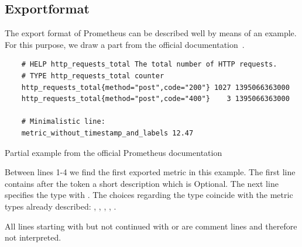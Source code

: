 \subsection{Exportformat}
The export format of Prometheus can be described well by means of an example. For this purpose, we draw a part from the official documentation~\cite{PrometheusExpositionFormatBeispiel}.\\
\par
\label{subsec:Exportformat}
\begin{listing}[H]
	\begin{verbatim}
	# HELP http_requests_total The total number of HTTP requests.
	# TYPE http_requests_total counter
	http_requests_total{method="post",code="200"} 1027 1395066363000
	http_requests_total{method="post",code="400"}    3 1395066363000
	
	# Minimalistic line:
	metric_without_timestamp_and_labels 12.47
	\end{verbatim}
	\caption{Partial example from the official Prometheus documentation~\cite{PrometheusExpositionFormatBeispiel}}
\end{listing}
Between lines 1-4 we find the first exported metric in this example. The first line contains after the token  a short description which is Optional. The next line specifies the type with \linebreak {}. The choices regarding the type coincide with the metric types already described: , , , , .

All lines starting with \promcode{#} but not continued with  or  are comment lines and therefore not interpreted.

